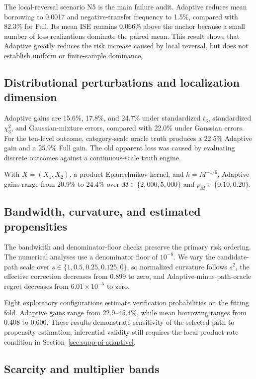 The local-reversal scenario N5 is the main failure audit. Adaptive reduces
mean borrowing to 0.0017 and negative-transfer frequency to 1.5\%, compared
with 82.3\% for Full. Its mean ISE remains 0.066\% above the anchor because a
small number of loss realizations dominate the paired mean. This result
shows that Adaptive greatly reduces the risk increase caused by local reversal,
but does not establish uniform or finite-sample dominance.

\subsection{Distributional perturbations and localization dimension}

Adaptive gains are 15.6\%, 17.8\%, and 24.7\% under standardized $t_3$,
standardized $\chi^2_3$, and Gaussian-mixture errors, compared with 22.0\%
under Gaussian errors. For the ten-level outcome, category-scale oracle truth
produces a 22.5\% Adaptive gain and a 25.9\% Full gain. The old apparent loss
was caused by evaluating discrete outcomes against a continuous-scale truth
engine.

With $X=(X_1,X_2)$, a product Epanechnikov kernel, and $h=M^{-1/6}$, Adaptive
gains range from 20.9\% to 24.4\% over
$M\in\{2{,}000,5{,}000\}$ and $p_M\in\{0.10,0.20\}$.

\subsection{Bandwidth, curvature, and estimated propensities}

The bandwidth and denominator-floor checks preserve the primary risk ordering.
The numerical analyses use a denominator floor of $10^{-8}$.
We vary the candidate-path scale over
$s\in\{1,0.5,0.25,0.125,0\}$, so normalized curvature follows $s^2$,
the effective correction decreases from 0.899 to zero, and
Adaptive-minus-path-oracle regret decreases from $6.01\times10^{-5}$ to zero.

Eight exploratory configurations estimate verification probabilities on the
fitting fold. Adaptive gains range from 22.9--45.4\%, while mean borrowing
ranges from 0.408 to 0.600. These results demonstrate sensitivity of the
selected path to propensity estimation; inferential validity still requires
the local product-rate condition in Section~\ref{sec:supp-pi-adaptive}.

\subsection{Scarcity and multiplier bands}


